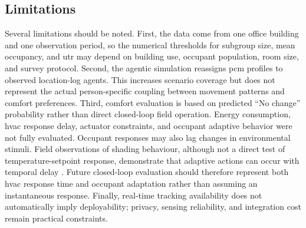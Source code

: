 \subsection{Limitations}
Several limitations should be noted.
First, the data come from one office building and one observation period, so the numerical thresholds for subgroup size, mean occupancy, and \ac{utr} may depend on building use, occupant population, room size, and survey protocol.
Second, the agentic simulation reassigns \ac{pcm} profiles to observed location-log agents.
This increases scenario coverage but does not represent the actual person-specific coupling between movement patterns and comfort preferences.
Third, comfort evaluation is based on predicted ``No change'' probability rather than direct closed-loop field operation.
Energy consumption, \ac{hvac} response delay, actuator constraints, and occupant adaptive behavior were not fully evaluated.
Occupant responses may also lag changes in environmental stimuli.
Field observations of shading behaviour, although not a direct test of temperature-setpoint response, demonstrate that adaptive actions can occur with temporal delay \cite{li_study_2022}.
Future closed-loop evaluation should therefore represent both \ac{hvac} response time and occupant adaptation rather than assuming an instantaneous response.
Finally, real-time tracking availability does not automatically imply deployability; privacy, sensing reliability, and integration cost remain practical constraints.
